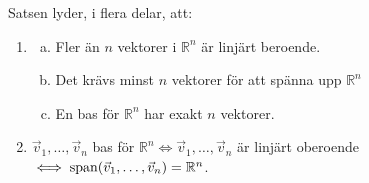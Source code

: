 \begin{theorem}[Bassatsen]
	Satsen lyder, i flera delar, att:
	\begin{enumerate}
		\item \begin{enumerate}[(a)]
			\item Fler än $n$ vektorer i $\mathbb{R}^n$ är linjärt beroende.
			\item Det krävs minst $n$ vektorer för att spänna upp $\mathbb{R}^n$
			\item En bas för $\mathbb{R}^n$ har exakt $n$ vektorer.
		\end{enumerate}
		\item $\vec{v}_1,\dots,\vec{v}_n$ bas för $\mathbb{R}^n
		\iff\vec{v}_1,\dots,\vec{v}_n$ är linjärt oberoende
		$\iff\operatorname{span}(\vec{v}_1,\dots,\vec{v}_n)=\mathbb{R}^n$.
	\end{enumerate}


\end{theorem}
